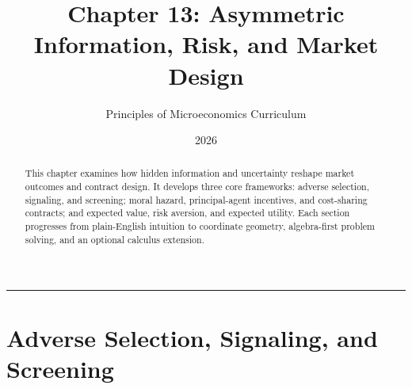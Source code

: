 \documentclass[11pt,letterpaper]{article}
\begin{document}
\title{\Huge\bfseries\color{SlateBlue} Chapter 13: Asymmetric Information, Risk, and Market Design}
\author{\large Principles of Microeconomics Curriculum}
\date{2026}
\maketitle

\thispagestyle{plain}

\begin{abstract}
This chapter examines how hidden information and uncertainty reshape market outcomes and contract design. It develops three core frameworks: adverse selection, signaling, and screening; moral hazard, principal-agent incentives, and cost-sharing contracts; and expected value, risk aversion, and expected utility. Each section progresses from plain-English intuition to coordinate geometry, algebra-first problem solving, and an optional calculus extension.
\end{abstract}

\tableofcontents
\vspace{1.5em}
\hrule
\vspace{1.5em}

\section{Adverse Selection, Signaling, and Screening}
\end{document}
